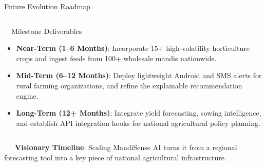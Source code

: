 \documentclass{beamer}
\begin{document}
\begin{frame}{Future Evolution Roadmap}
\begin{columns}[T]
    \begin{column}{0.51\textwidth}
        \begin{successcard}[height=5.2cm]{~~Milestone Deliverables}
            \fontsize{6.5pt}{8.0pt}\selectfont
            \begin{itemize}\setlength\itemsep{4.5pt}\setlength\parskip{0pt}
                \item \textbf{Near-Term (1--6 Months)}: Incorporate 15+ high-volatility horticulture crops and ingest feeds from 100+ wholesale mandis nationwide.
                \item \textbf{Mid-Term (6--12 Months)}: Deploy lightweight Android and SMS alerts for rural farming organizations, and refine the explainable recommendation engine.
                \item \textbf{Long-Term (12+ Months)}: Integrate yield forecasting, sowing intelligence, and establish API integration hooks for national agricultural policy planning.
            \end{itemize}
        \end{successcard}
    \end{column}
\end{columns}

\vspace{0.15cm}
\begin{tcolorbox}[enhanced, colback=primaryblue!4, colframe=primaryblue!30, boxrule=0.35pt,
  arc=3.5pt, width=0.98\textwidth, left=4pt, right=4pt, top=2.5pt, bottom=2.5pt, boxsep=0pt,
  halign=center, shadow={0.5pt}{-0.5pt}{0pt}{black!8}]
    \fontsize{5.5pt}{6.5pt}\selectfont
    \textcolor{primaryDark}{~~~\textbf{Visionary Timeline}: Scaling MandiSense AI turns it from a regional forecasting tool into a key piece of national agricultural infrastructure.}
\end{tcolorbox}
\end{frame}
\end{document}

